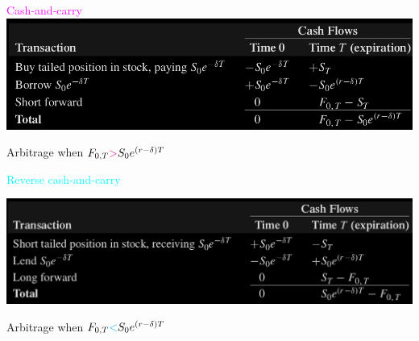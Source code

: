 \begin{frame}[fragile,t]
	\begin{center}
		\textcolor{magenta}{Cash-and-carry}
		\includegraphics[scale=0.25]{figs/Table-5-6.png}

		\bigskip
		Arbitrage when $F_{0,T}\textcolor{magenta}{>}S_0 e^{(r-\delta)T}$

		\vfill
		\mySeparateLine
		\vfill

		\textcolor{cyan}{Reverse cash-and-carry}
		\bigskip

		\includegraphics[scale=0.25]{figs/Table-5-7.png}
		\bigskip

		Arbitrage when $F_{0,T}\textcolor{cyan}{<}S_0 e^{(r-\delta)T}$
	\end{center}
\end{frame}
